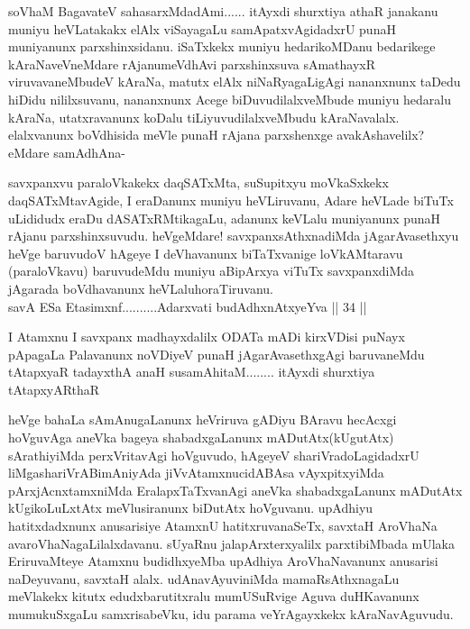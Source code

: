 \begin{artha}
soV\s haM BagavateV sahasarxMdadAmi...... itAyxdi shurxtiya athaR janakanu muniyu heVLatakakx elAlx viSayagaLu samApatxvAgidadxrU punaH muniyanunx parxshinxsidanu. iSaTxkekx muniyu hedarikoMDanu bedarikege kAraNaveVneMdare rAjanumeVdhAvi parxshinxsuva sAmathayxR viruvavaneMbudeV kAraNa, matutx elAlx niNaRyagaLigAgi nananxnunx taDedu hiDidu nililxsuvanu, nananxnunx Acege biDuvudilalxveMbude muniyu hedaralu kAraNa, utatxravanunx koDalu tiLiyuvudilalxveMbudu kAraNavalalx. elalxvanunx boVdhisida meVle punaH rAjana parxshenxge avakAshavelilx? eMdare samAdhAna-
\end{artha}
\newpage
\begin{artha}
savxpanxvu paraloVkakekx daqSATxMta, suSupitxyu moVkaSxkekx daqSATxMtavAgide, I eraDanunx muniyu heVLiruvanu, Adare heVLade biTuTx uLididudx eraDu dASATxRMtikagaLu, adanunx keVLalu muniyanunx punaH rAjanu parxshinxsuvudu. heVgeMdare! savxpanxsAthxnadiMda jAgarAvasethxyu heVge baruvudoV hAgeye I deVhavanunx biTaTxvanige loVkAMtaravu (paraloVkavu) baruvudeMdu muniyu aBipArxya viTuTx savxpanxdiMda jAgarada boVdhavanunx heVLalu\break horaTiruvanu.\\
savA ESa Etasimxnf..........Adarxvati budAdhxnAtxyeYva || 34 ||
\end{artha}%

\begin{artha}
I Atamxnu I savxpanx madhayxdalilx ODATa mADi kirxVDisi puNayx pApagaLa Palavanunx noVDiyeV punaH jAgarAvasethxgAgi baruvaneMdu tAtapxyaR tadayxthA anaH susamAhitaM........ itAyxdi shurxtiya tAtapxyARthaR
\end{artha}


\begin{artha}
heVge bahaLa sAmAnugaLanunx heVriruva gADiyu BAravu hecAcxgi hoVguvAga aneVka bageya shabadxgaLanunx mADutAtx\break (kUgutAtx) sArathiyiMda perxVritavAgi hoVguvudo, hAgeyeV shariVradoLagidadxrU liMgashariVrABimAniyAda jiVvAtamxnu\break cidABAsa vAyxpitxyiMda pArxjAcnxtamxniMda EralapxTaTxvanAgi aneVka shabadxgaLanunx mADutAtx kUgikoLuLxtAtx meVlusiranunx biDutAtx hoVguvanu. upAdhiyu hatitxdadxnunx anusarisiye AtamxnU hatitxruvanaSeTx, savxtaH AroVhaNa avaroVhaNagaLilalxdavanu. sUyaRnu jalapArxterxyalilx parxtibiMbada mUlaka EriruvaMteye Atamxnu budidhxyeMba upAdhiya AroVhaNavanunx anusarisi naDeyuvanu, savxtaH alalx. udAnavAyuviniMda mamaRsAthxnagaLu meVlakekx kitutx edudx\break barutitxralu mumUSuRvige Aguva duHKavanunx mumukuSxgaLu samxrisabeVku, idu parama veYrAgayxkekx kAraNavAguvudu.  
\end{artha}

